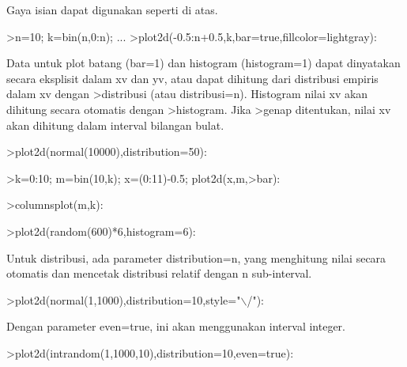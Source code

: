 \documentclass[a4paper,10pt]{article}
\begin{document}
\begin{eulernotebook}
\begin{eulercomment}
\begin{eulercomment}
\begin{eulercomment}
\begin{eulercomment}
\begin{eulercomment}
\begin{eulercomment}
\begin{eulercomment}
\begin{eulercomment}
\begin{eulercomment}
Gaya isian dapat digunakan seperti di atas.
\end{eulercomment}
\begin{eulerprompt}
>n=10; k=bin(n,0:n); ...
>plot2d(-0.5:n+0.5,k,bar=true,fillcolor=lightgray):
\end{eulerprompt}
\begin{eulercomment}
Data untuk plot batang (bar=1) dan histogram (histogram=1) dapat
dinyatakan secara eksplisit dalam xv dan yv, atau dapat dihitung dari
distribusi empiris dalam xv dengan \textgreater{}distribusi (atau distribusi=n).
Histogram nilai xv akan dihitung secara otomatis dengan \textgreater{}histogram.
Jika \textgreater{}genap ditentukan, nilai xv akan dihitung dalam interval bilangan
bulat.
\end{eulercomment}
\begin{eulerprompt}
>plot2d(normal(10000),distribution=50):
\end{eulerprompt}
\begin{eulerprompt}
>k=0:10; m=bin(10,k); x=(0:11)-0.5; plot2d(x,m,>bar):
\end{eulerprompt}
\begin{eulerprompt}
>columnsplot(m,k):
\end{eulerprompt}
\begin{eulerprompt}
>plot2d(random(600)*6,histogram=6):
\end{eulerprompt}
\begin{eulercomment}
Untuk distribusi, ada parameter distribution=n, yang menghitung nilai
secara otomatis dan mencetak distribusi relatif dengan n sub-interval.
\end{eulercomment}
\begin{eulerprompt}
>plot2d(normal(1,1000),distribution=10,style="\(\backslash\)/"):
\end{eulerprompt}
\begin{eulercomment}
Dengan parameter even=true, ini akan menggunakan interval integer.
\end{eulercomment}
\begin{eulerprompt}
>plot2d(intrandom(1,1000,10),distribution=10,even=true):
\end{eulerprompt}

\end{eulercomment}
\end{eulercomment}
\end{eulercomment}
\end{eulercomment}
\end{eulercomment}
\end{eulercomment}
\end{eulercomment}
\end{eulercomment}
\end{eulernotebook}
\end{document}
